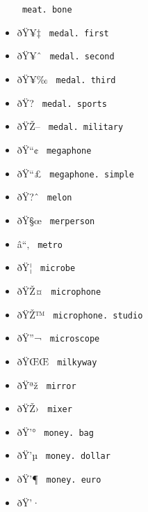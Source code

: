 \begin{itemize}
{  \texttt{\ meat.\ bone\ }}
\item
  \label{symbol-medal.first}{{ ðŸ¥‡ }
  \texttt{\ medal.\ first\ }}
\item
  \label{symbol-medal.second}{{ ðŸ¥ˆ }
  \texttt{\ medal.\ second\ }}
\item
  \label{symbol-medal.third}{{ ðŸ¥‰ }
  \texttt{\ medal.\ third\ }}
\item
  \label{symbol-medal.sports}{{ ðŸ? }
  \texttt{\ medal.\ sports\ }}
\item
  \label{symbol-medal.military}{{ ðŸŽ-- }
  \texttt{\ medal.\ military\ }}
\item
  \label{symbol-megaphone}{{ ðŸ``¢ }
  \texttt{\ megaphone\ }}
\item
  \label{symbol-megaphone.simple}{{ ðŸ``£ }
  \texttt{\ megaphone.\ simple\ }}
\item
  \label{symbol-melon}{{ ðŸ?ˆ } \texttt{\ melon\ }}
\item
  \label{symbol-merperson}{{ ðŸ§œ }
  \texttt{\ merperson\ }}
\item
  \label{symbol-metro}{{ â``‚ } \texttt{\ metro\ }}
\item
  \label{symbol-microbe}{{ ðŸ¦ } \texttt{\ microbe\ }}
\item
  \label{symbol-microphone}{{ ðŸŽ¤ }
  \texttt{\ microphone\ }}
\item
  \label{symbol-microphone.studio}{{ ðŸŽ™ }
  \texttt{\ microphone.\ studio\ }}
\item
  \label{symbol-microscope}{{ ðŸ''¬ }
  \texttt{\ microscope\ }}
\item
  \label{symbol-milkyway}{{ ðŸŒŒ } \texttt{\ milkyway\ }}
\item
  \label{symbol-mirror}{{ ðŸªž } \texttt{\ mirror\ }}
\item
  \label{symbol-mixer}{{ ðŸŽ› } \texttt{\ mixer\ }}
\item
  \label{symbol-money.bag}{{ ðŸ'° }
  \texttt{\ money.\ bag\ }}
\item
  \label{symbol-money.dollar}{{ ðŸ'µ }
  \texttt{\ money.\ dollar\ }}
\item
  \label{symbol-money.euro}{{ ðŸ'¶ }
  \texttt{\ money.\ euro\ }}
\item
  \label{symbol-money.pound}{{ ðŸ'· }
}
\end{itemize}
